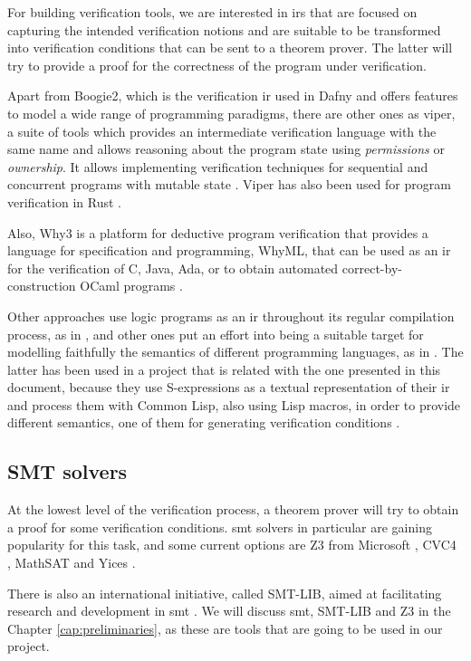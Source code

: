 For building verification tools, we are interested in \gls{ir}s that are focused
on capturing the intended verification notions and are suitable to be
transformed into verification conditions that can be sent to a theorem prover.
The latter will try to provide a proof for the correctness of the program under
verification.

Apart from Boogie2, which is the verification \gls{ir} used in Dafny and offers 
features to model a wide range of programming paradigms, there are other ones as
\gls{viper}, a suite of tools which provides an intermediate verification
language with the same name and allows reasoning about the program state using
\textit{permissions} or \textit{ownership}. It allows implementing verification
techniques for sequential and concurrent programs with mutable state
\citep{viper}. Viper has also been used for program verification in Rust 
\citep{astrauskas2022prusti}.

Also, Why3 \citep{Why3} is a platform for deductive program verification that
provides a language for specification and programming, WhyML, that can be used
as an \gls{ir} for the verification of C, Java, Ada, or to obtain automated
correct-by-construction OCaml programs \citep{Why3Manual}.

Other approaches use logic programs as an \gls{ir} throughout its regular
compilation process, as in \cite{horn}, and other ones put an effort into being
a suitable target for modelling faithfully the semantics of different
programming languages, as in \cite{caviart}. The latter has been used in a
project that is related with the one presented in this document, because they
use S-expressions as a textual representation of their \gls{ir} and process them
with Common Lisp, also using Lisp macros, in order to provide different
semantics, one of them for generating verification conditions \citep{cavilisp}.

\subsection{SMT solvers}

At the lowest level of the verification process, a theorem prover will try to
obtain a proof for some verification conditions. \acrshort{smt} solvers in
particular are gaining popularity for this task, and some current options are Z3
from Microsoft \citep{moura2008z3}, CVC4 \citep{barrett2011cvc4}, MathSAT
\citep{bozzano2005mathsat} and Yices \citep{dutertre2006yices}. 

There is also an international initiative, called SMT-LIB, aimed at facilitating
research and development in \gls{smt} \citep{smtLibStandard}. We will discuss 
\gls{smt}, SMT-LIB and Z3 in the Chapter \ref{cap:preliminaries}, as these are
tools that are going to be used in our project.

